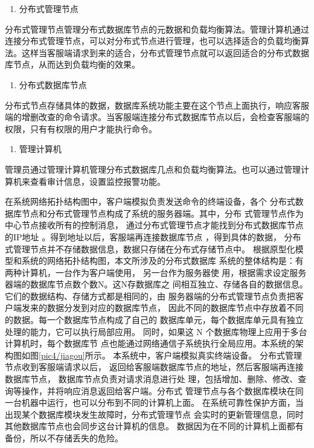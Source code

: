 	\begin{enumerate}[resume]
		\item 分布式管理节点
	\end{enumerate}

	分布式管理节点管理分布式数据库节点的元数据和负载均衡算法。管理计算机通过连接分布式管理节点，可以对分布式节点进行管理，也可以选择适合的负载均衡算法。这样当客服端请求到来的适合，分布式管理节点就可以返回适合的分布式数据库节点，从而达到负载均衡的效果。

	\begin{enumerate}[resume]
		\item 分布式数据库节点
	\end{enumerate}

	分布式节点存储具体的数据，数据库系统功能主要在这个节点上面执行，响应客服端的增删改查的命令请求。当客服端连接分布式数据库节点以后，会检查客服端的权限，只有有权限的用户才能执行命令。

	\begin{enumerate}[resume]
		\item 管理计算机
	\end{enumerate}

	管理员通过管理计算机管理分布式数据库几点和负载均衡算法。也可以通过管理计算机来查看审计信息，设置监控报警功能。


在系统网络拓扑结构图中，客户端模拟负责发送命令的终端设备，各个
分布式数据库节点和分布式管理节点构成了系统的服务器端。其中，分布
式管理节点作为中心节点接收所有的控制消息，
通过分布式管理节点才能找到分布式数据库节点的IP地址
。得到地址以后，客服端再连接数据库节点
，得到具体的数据，
分布式管理节点并不存储数据信息，数据只存储在分布式存储节点中。
根据原型化模型和系统的网络拓扑结构图，本文所涉及的分布式数据库
系统的整体结构是：有两种计算机，一台作为客户端使用，
另一台作为服务器使
用，根据需求设定服务器端的数据库节点数个数N。这N存数据库之
间相互独立、存储各自的数据信息。它们的数据结构、存储方式都是相同的，由
服务器端的分布式管理节点负责把客户端发来的数据分发到对应的数据库节点，
因此不同的数据库节点中存放着不同的数据。每一个数据库节点构成了自己的
数据库单元，每个数据库单元具有独立处理的能力，它可以执行局部应用。
同时，如果这 N 个数据库物理上应用于多台计算机时，每个数据库节
点也能通过网络通信子系统执行全局应用。本系统的架构图如图\ref{pic4/jiagou}所示。
本系统中，客户端模拟真实终端设备。
分布式管理节点收到客服端请求以后，
返回给客服端数据库节点的地址，然后客服端再连接数据库节点，
数据库节点负责对请求消息进行处
理，包括增加、删除、修改、查询等操作，并将响应消息返回给客户端。分布式
管理节点与各个数据库模块在同一台机器中运行，也可以分布到不同的计算机上面。
在系统可靠性保护方面，当出现某个数据库模块发生故障时，分布式管理节点
会实时的更新管理信息，同时其他数据库节点也会同步这台计算机的信息。
数据因为在不同的计算机上面都有备份，所以不存储丢失的危险。
